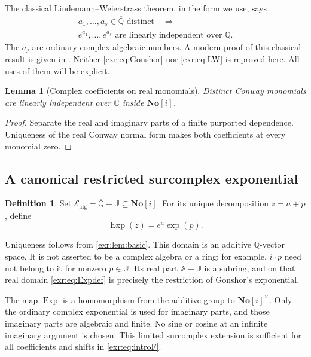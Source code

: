 \documentclass[11pt,letterpaper]{article}
\numberwithin{equation}{section}
\newtheorem{lemma}[lemma]{Lemma}
\theoremstyle{definition}
\newtheorem{definition}[definition]{Definition}
\theoremstyle{remark}
\newcommand{\SC}{\mathbf{No}[i]}
\newcommand{\Q}{\mathbb Q}
\newcommand{\C}{\mathbb C}
\newcommand{\A}{\mathbb A}
\newcommand{\Qb}{\overline{\mathbb Q}}
\newcommand{\J}{\mathbb J}
\newcommand{\Ealg}{\mathcal E_{\mathrm{alg}}}
\newcommand{\Exp}{\operatorname{Exp}}
\begin{document}
The classical Lindemann--Weierstrass theorem, in the form we use, says
\begin{equation}\label{exr:eq:LW}
 \begin{gathered}
 a_1,\ldots,a_s\in\Qb\text{ distinct}\quad\Longrightarrow\\
 e^{a_1},\ldots,e^{a_s}\text{ are linearly independent over }\Qb.
 \end{gathered}
\end{equation}
The $a_j$ are ordinary complex algebraic numbers. A modern proof of this classical
result is given in \cite{popescu}. Neither \eqref{exr:eq:Gonshor} nor \eqref{exr:eq:LW} is
reproved here. All uses of them will be explicit.

\begin{lemma}[Complex coefficients on real monomials]\label{exr:lem:monomial}
Distinct Conway monomials are linearly independent over $\C$ inside $\SC$.
\end{lemma}
\begin{proof}
Separate the real and imaginary parts of a finite purported dependence. Uniqueness
of the real Conway normal form makes both coefficients at every monomial zero.
\end{proof}

\subsection{A canonical restricted surcomplex exponential}
\begin{definition}\label{exr:def:domain}
Set $\Ealg=\Qb+\J\subseteq\SC$. For its unique decomposition $z=a+p$, define
\begin{equation}\label{exr:eq:Expdef} \Exp(z)=e^a\exp(p). \end{equation}
\end{definition}
Uniqueness follows from \cref{exr:lem:basic}. This domain is an additive $\Q$-vector
space. It is not asserted to be a complex algebra or a ring: for example,
$i\cdot p$ need not belong to it for nonzero $p\in\J$. Its real part
$\A+\J$ is a subring, and on that real domain \eqref{exr:eq:Expdef} is precisely the
restriction of Gonshor's exponential.

The map $\Exp$ is a homomorphism from the additive group to $\SC^\times$.
Only the ordinary complex exponential is used for imaginary parts, and those
imaginary parts are algebraic and finite. No sine or cosine at an infinite
imaginary argument is chosen. This limited surcomplex extension is sufficient for
all coefficients and shifts in \eqref{exr:eq:introF}.
\end{document}
